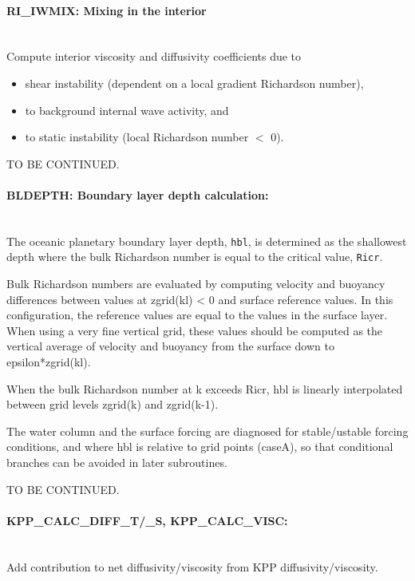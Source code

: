 \paragraph{RI\_IWMIX: Mixing in the interior} ~ \\
%
Compute interior viscosity and diffusivity coefficients due to
%
\begin{itemize}
%
\item
shear instability (dependent on a local gradient Richardson number),
%
\item
to background internal wave activity, and
%
\item
to static instability (local Richardson number $<$ 0).
%
\end{itemize}

TO BE CONTINUED.

\paragraph{BLDEPTH: Boundary layer depth calculation:} ~ \\
%
The oceanic planetary boundary layer depth, \texttt{hbl}, is determined as
the shallowest depth where the bulk Richardson number is
equal to the critical value, \texttt{Ricr}.

Bulk Richardson numbers are evaluated by computing velocity and
buoyancy differences between values at zgrid(kl) < 0 and surface
reference values.
In this configuration, the reference values are equal to the
values in the surface layer.
When using a very fine vertical grid, these values should be
computed as the vertical average of velocity and buoyancy from
the surface down to epsilon*zgrid(kl).

When the bulk Richardson number at k exceeds Ricr, hbl is
linearly interpolated between grid levels zgrid(k) and zgrid(k-1).

The water column and the surface forcing are diagnosed for
stable/ustable forcing conditions, and where hbl is relative
to grid points (caseA), so that conditional branches can be
avoided in later subroutines.

TO BE CONTINUED.

\paragraph{KPP\_CALC\_DIFF\_T/\_S, KPP\_CALC\_VISC:} ~  \\
%
Add contribution to net diffusivity/viscosity from 
KPP diffusivity/viscosity.

